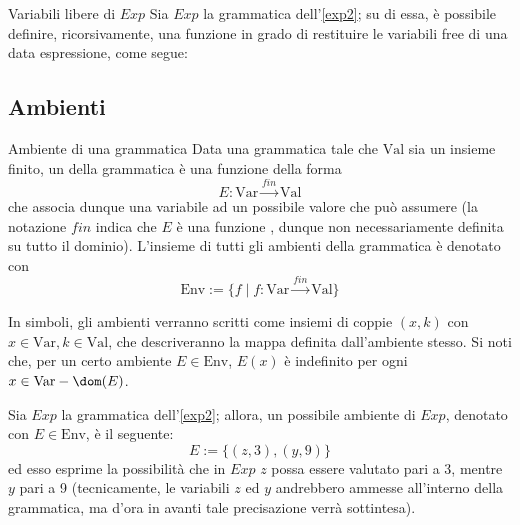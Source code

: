 \documentclass[a4paper, 12pt]{report}
\begin{document}
    \begin{framedobs}{Variabili libere di $Exp$}
        Sia $Exp$ la grammatica dell'\cref{exp2}; su di essa, è possibile definire, ricorsivamente, una funzione in grado di restituire le variabili free di una data espressione, come segue: 
    \end{framedobs}

    \subsection{Ambienti}
    
    \begin{frameddefn}[label={env}]{Ambiente di una grammatica}
        Data una grammatica tale che $\mathrm{Val}$ sia un insieme finito, un  della grammatica è una funzione della forma $$E: \mathrm{Var} \xrightarrow{fin} \mathrm{Val}$$ che associa dunque una variabile ad un possibile valore che può assumere (la notazione $fin$ indica che $E$ è una funzione , dunque non necessariamente definita su tutto il dominio). L'insieme di tutti gli ambienti della grammatica è denotato con $$\mathrm{Env} := \{f \mid f : \mathrm{Var} \xrightarrow{fin} \mathrm{Val} \}$$

        In simboli, gli ambienti verranno scritti come insiemi di coppie $(x, k)$ con $x \in \mathrm{Var}, k \in \mathrm{Val}$, che descriveranno la mappa definita dall'ambiente stesso. Si noti che, per un certo ambiente $E \in \mathrm{Env}$, $E(x)$ è indefinito per ogni $x \in \mathrm{Var} - \dom(E)$.
    \end{frameddefn}

    \begin{example}
        Sia $Exp$ la grammatica dell'\cref{exp2}; allora, un possibile ambiente di $Exp$, denotato con $E \in \mathrm{Env}$, è il seguente: $$E := \{(z,3), (y, 9) \}$$ ed esso esprime la possibilità che in $Exp$ $z$ possa essere valutato pari a 3, mentre $y$ pari a 9 (tecnicamente, le variabili $z$ ed $y$ andrebbero ammesse all'interno della grammatica, ma d'ora in avanti tale precisazione verrà sottintesa).
    \end{example}
\end{document}
